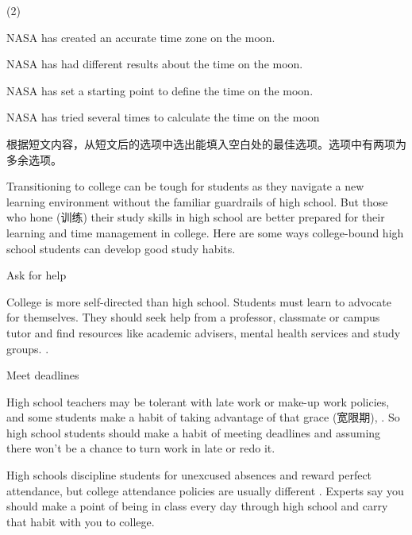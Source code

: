 \documentclass{英语试卷}
\begin{document}
\begin{choices}(2)
  \item NASA has created an accurate time zone on the moon.
  \item NASA has had different results about the time on the moon.
  \item NASA has set a starting point to define the time on the moon.
  \item NASA has tried several times to calculate the time on the moon
\end{choices}
\par 根据短文内容，从短文后的选项中选出能填入空白处的最佳选项。选项中有两项为多余选项。\par
\par Transitioning to college can be tough for students as they navigate a new learning environment without the familiar guardrails of high school. But those who hone (训练) their study skills in high school are better prepared for their learning and time management in college. Here are some ways college-bound high school students can develop good study habits.\par
\par Ask for help\par
\par College is more self-directed than high school. Students must learn to advocate for themselves. They should seek help from a professor, classmate or campus tutor and find resources like academic advisers, mental health services and study groups. .\par
\par Meet deadlines\par
\par High school teachers may be tolerant with late work or make-up work policies, and some students make a habit of taking advantage of that grace (宽限期), . So high school students should make a habit of meeting deadlines and assuming there won't be a chance to turn work in late or redo it.\par
\par {}\par
\par High schools discipline students for unexcused absences and reward perfect attendance, but college attendance policies are usually different . Experts say you should make a point of being in class every day through high school and carry that habit with you to college.\par
\end{document}
